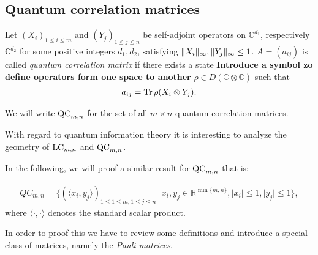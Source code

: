 \subsection{Quantum correlation matrices}

\begin{dfn}
	Let $ (X_i)_{1 \le i \le m } $ and $ (Y_j)_{1 \le j \le n} $ be self-adjoint operators on $ \mathbb{C}^{d_1} $, respectively $ \mathbb{C}^{d_2} $ for some positive integers $ d_1,d_2 $, satisfying $  \Vert {X_i} \Vert_{\infty},  \Vert {Y_j} \Vert_{\infty} \le 1 $. $ A = (a_{ij}) $ is called {\itshape quantum correlation matrix} if there exists a state \textbf{Introduce a symbol zo define operators form one space to another} $ \rho \in D(\mathbb{C} \otimes \mathbb{C})$ such that 
	\begin{align}\label{QCaij}
	a_{ij} = \text{Tr} \, {\rho (X_i \otimes Y_j)} .
	\end{align}
\end{dfn}
We will write $ \textup{QC}_{m,n} $ for the set of all $ m \times n $ quantum correlation matrices.

With regard to quantum information theory it is interesting to analyze the geometry of $ \textup{LC}_{m,n} $ and $ \textup{QC}_{m,n} $. 


In the following, we will proof a similar result for $ \textup{QC}_{m,n} $ that is: 
\begin{lemma}\label{LemQC}
	\begin{align*}\label{EqQC}
		QC_{m,n} = \{ (\langle x_i,y_j \rangle)_{1 \le 1 \le m, 1 \le j \le n} \,| \, x_i,y_j \in \mathbb{R}^{ \min \{m,n \} }, \vert x_i  \vert \le 1, \vert y_j \vert \le 1  \},
	\end{align*}
	where $ \langle \cdot , \cdot \rangle $ denotes the standard scalar product. 
\end{lemma}
In order to proof this we have to review some definitions and introduce a special class of matrices, namely the {\itshape Pauli matrices}.

